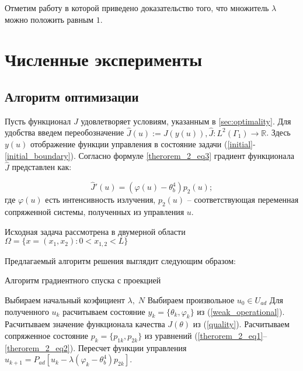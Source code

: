 \documentclass[12pt,a4paper]{article}%
\begin{document}
    Отметим работу \cite{covt_last} в которой приведено доказательство того, что множитель $\lambda$ можно положить равным $1$.


\section{Численные эксперименты}
\subsection{Алгоритм оптимизации}
    Пусть функционал $J$ удовлетворяет условиям, указанным в \autoref{sec:optimality}. Для удобства введем переобозначение $\hat{J}(u):=J(y(u)), \hat{J}:L^2(\Gamma_1) \to \mathbb{R}$. Здесь $y(u)$ отображение функции управления в состояние задачи (\ref{initial}-\ref{initial_boundary}).
    Согласно формуле \eqref{therorem_2_eq3} градиент функционала $\hat{J}$ представлен как:

    $$\hat{J}'(u)= (\varphi(u) -\theta_b^4)p_2(u);$$
    где $\varphi(u)$ есть интенсивность излучения, $p_2(u)$ -- соответствующая переменная сопряженной системы, полученных из управления $u$.

    Исходная задача рассмотрена в двумерной области $\Omega = \{x = (x_1,x_2):0 < x_{1,2} < L\}$

    Предлагаемый алгоритм решения выглядит следующим образом:


    \begin{algorithm}
    \caption{Алгоритм градиентного спуска с проекцией}\label{algo1}
    \begin{algorithmic}[1]
    \State Выбираем начальный коэфициент $\lambda, \; N$
    \State Выбираем произвольное $u_0 \in U_{ad}$
        \State Для полученного $u_k$ расчитываем состояние $y_k = \{\theta_k, \varphi_k\}$ из  (\ref{weak_operational}).
        \State Расчитываем значение функционала качества $J(\theta)$ из (\ref{quality}).
        \State Расчитываем сопряженное состояние $p_k=\{p_{1k},p_{2k}\}$ из уравнений (\ref{therorem_2_eq1}--\ref{therorem_2_eq2}).
        \State Пересчет функции управления $u_{k+1} = P_{ad}\left[ u_k - \lambda (\varphi_k - \theta_b^4)p_{2k} \right]$.
    \EndFor
    \end{algorithmic}
    \end{algorithm}
\end{document}
